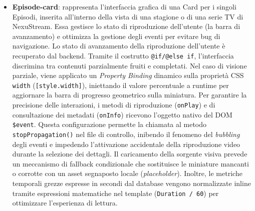 \documentclass[11pt,a4paper]{article}
\begin{document}
\begin{itemize}
    \item \textbf{Episode-card}: rappresenta l'interfaccia grafica di una Card per i singoli Episodi, inserita all'interno della vista di una stagione o di una serie TV di NexuStream. Essa gestisce lo stato di riproduzione dell'utente (la barra di avanzamento) e ottimizza la gestione degli eventi per evitare bug di navigazione. Lo stato di avanzamento della riproduzione dell'utente è recuperato dal backend. Tramite il costrutto \texttt{@if/@else if}, l'interfaccia discrimina tra contenuti parzialmente fruiti e completati. Nel caso di visione parziale, viene applicato un \textit{Property Binding} dinamico sulla proprietà CSS \texttt{width} (\texttt{[style.width]}), iniettando il valore percentuale a runtime per aggiornare la barra di progresso geometrico sulla miniatura. Per garantire la precisione delle interazioni, i metodi di riproduzione (\texttt{onPlay}) e di consultazione dei metadati (\texttt{onInfo}) ricevono l'oggetto nativo del DOM \texttt{\$event}. Questa configurazione permette la chiamata al metodo \texttt{stopPropagation()} nel file di controllo, inibendo il fenomeno del \textit{bubbling} degli eventi e impedendo l'attivazione accidentale della riproduzione video durante la selezione dei dettagli. Il caricamento della sorgente visiva prevede un meccanismo di fallback condizionale che sostituisce le miniature mancanti o corrotte con un asset segnaposto locale (\textit{placeholder}). Inoltre, le metriche temporali grezze espresse in secondi dal database vengono normalizzate inline tramite espressioni matematiche nel template (\texttt{Duration / 60}) per ottimizzare l'esperienza di lettura.
    

\end{itemize}
\end{document}
